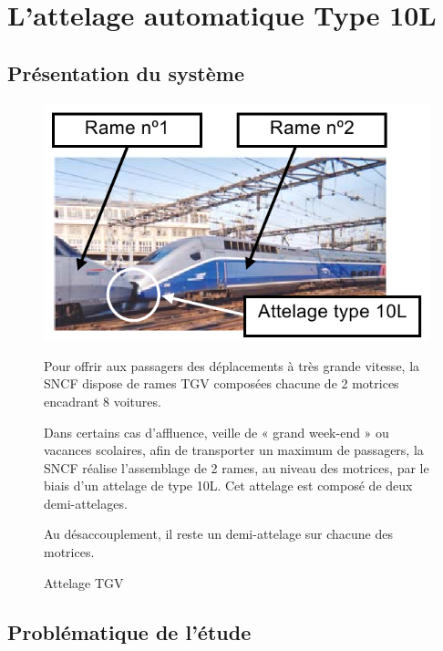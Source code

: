 

\newpage

\section{L'attelage automatique Type 10L}

\subsection{Présentation du système}

\begin{figure}[!h]
  \begin{minipage}{0.35\linewidth}
  \centering\includegraphics[width=1\linewidth]{img/tgv.png}
  \end{minipage}
  \hfill
  \begin{minipage}{0.60\linewidth}
Pour offrir aux passagers des déplacements à très grande vitesse, la SNCF dispose de rames TGV composées chacune de 2 motrices encadrant 8 voitures.

Dans certains cas d'affluence, veille de « grand week-end » ou vacances scolaires, afin de transporter un maximum de passagers, la SNCF réalise l'assemblage de 2 rames, au niveau des motrices, par le biais d'un attelage de type 10L. Cet attelage est composé de deux demi-attelages.

Au désaccouplement, il reste un demi-attelage sur chacune des motrices.
  \end{minipage}
  \caption{Attelage TGV}
\end{figure}

\subsection{Problématique de l'étude}

